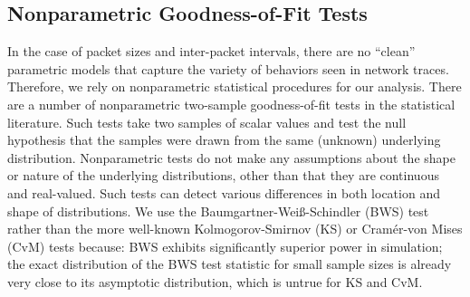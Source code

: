 \documentclass[conference]{IEEEtran}
\newcommand{\caps}[1]{{\small{#1}}}
\begin{document}
\subsection{Nonparametric Goodness-of-Fit Tests}



In the case of packet sizes and inter-packet intervals, there are no ``clean'' parametric models that capture the variety of behaviors seen in network traces. Therefore, we rely on nonparametric statistical procedures for our analysis. There are a number of nonparametric two-sample goodness-of-fit tests in the statistical literature. %
Such tests take two samples of scalar values and test the null hypothesis that the samples were drawn from the same (unknown) underlying distribution. Nonparametric tests do not make any assumptions about the shape or nature of the underlying distributions, other than that they are continuous and real-valued. Such tests can detect various differences in both location and shape of distributions. We use the Baumgartner-Wei\ss-Schindler (\caps{BWS}) test~\cite{Baumgartner98} rather than the more well-known Kolmogorov-Smirnov (\caps{KS}) or Cram\'er-von Mises (\caps{CvM}) tests because: \caps{BWS} exhibits significantly superior power in simulation; the exact distribution of the \caps{BWS} test statistic for small sample sizes is already very close to its asymptotic distribution, which is untrue for \caps{KS} and \caps{CvM}.
\end{document}
